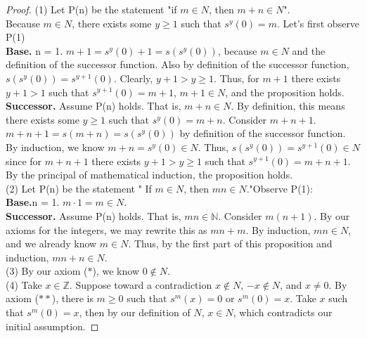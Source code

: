 \documentclass[12pt]{amsart}
\newcommand{\N}{\mathbb{N}}
\newcommand{\Z}{\mathbb{Z}}
\begin{document}
\begin{proof}
	(1) Let P(n) be the statement "if $m \in N$, then $m + n \in N$".\\Because $m \in N$, there exists some $y \geq 1$ such that $ s^y(0) = m$. Let's first observe P(1)
	\\\textbf{Base.} n = 1. $m + 1 = s^y(0) + 1 = s(s^y(0))$, because $m \in N$ and the definition of the successor function. Also by definition of the successor function, $s(s^y(0)) = s^{y+1}(0)$. Clearly, $y+1 > y \geq 1$. Thus, for $m+1$ there exists $y+1 > 1$ such that $s^{y+1}(0) = m+1$, $m+1 \in N$, and the proposition holds.
	\\\textbf{Successor.} Assume P(n) holds. That is, $m + n \in N$. By definition, this means there exists some $y \geq 1$ such that $s^y(0) = m+n$. Consider $m + n + 1$. $m + n + 1 = s(m + n) = s(s^y(0))$ by definition of the successor function. By induction, we know $m + n = s^y(0) \in N$. Thus, $s(s^{y}(0)) = s^{y+1}(0) \in N$ since for $m + n + 1$ there exists $y + 1 > y \geq 1$ such that $s^{y+1}(0) = m + n + 1$. By the principal of mathematical induction, the proposition holds.
	\\\indent (2) Let P(n) be the statement " If $m \in N$, then $mn \in N$."Observe P(1):
	\\\textbf{Base.}n = 1. $m \cdot 1 = m \in N$.
	\\\textbf{Successor.} Assume P(n) holds. That is, $mn \in \N$. Consider $m(n+1)$. By our axioms for the integers, we may rewrite this as $mn + m$. By induction, $mn \in N$, and we already know $m \in N$. Thus, by the first part of this proposition and induction, $mn + n \in N$.
	\\\indent (3) By our axiom ($\ast$), we know $0 \notin N$.
	\\\indent (4) Take $x \in \Z$. Suppose toward a contradiction $x \notin N$, $-x \notin N$, and $x \neq 0$. By axiom ($\ast\ast$), there is $m \geq 0$ such that $s^m(x) = 0$ or $s^m(0) = x$. Take $x$ such that $s^m(0) = x$, then by our definition of $N$, $x \in N$, which contradicts our initial assumption.

\end{proof}
\end{document}
